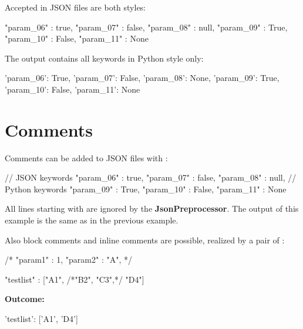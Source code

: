 Accepted in JSON files are both styles:

\begin{pythoncode}
{
   "param_06" : true,
   "param_07" : false,
   "param_08" : null,
   "param_09" : True,
   "param_10" : False,
   "param_11" : None
}
\end{pythoncode}

The output contains all keywords in Python style only:

\begin{pythonlog}
{'param_06': True,
 'param_07': False,
 'param_08': None,
 'param_09': True,
 'param_10': False,
 'param_11': None}
\end{pythonlog}



\newpage

\section{Comments}

Comments can be added to JSON files with \pcode{//}:

\begin{pythoncode}
{
   // JSON keywords
   "param_06" : true,
   "param_07" : false,
   "param_08" : null,
   // Python keywords
   "param_09" : True,
   "param_10" : False,
   "param_11" : None
}
\end{pythoncode}

All lines starting with \pcode{//} are ignored by the \textbf{JsonPreprocessor}. The output of this example is the same as in the previous example.

\vspace{2ex}

Also block comments and inline comments are possible, realized by a pair of \pcode{/* */}:

\begin{pythoncode}
{
   /*
   "param1" : 1,
   "param2" : "A",
   */

   "testlist" : ["A1", /*"B2", "C3",*/ "D4"]
}
\end{pythoncode}

\vspace{2ex}

\textbf{Outcome:}

\begin{pythonlog}
{'testlist': ['A1', 'D4']}
\end{pythonlog}

